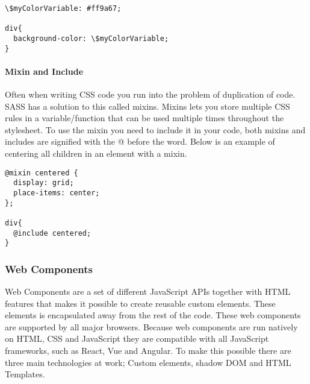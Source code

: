 \begin{lstlisting}[style=htmlcssjs]
\$myColorVariable: #ff9a67; 

div{
  background-color: \$myColorVariable;
}
\end{lstlisting}


\paragraph{Mixin and Include}
Often when writing CSS code you run into the problem of duplication of code. SASS has a solution to this called mixins. Mixins lets you store multiple CSS rules in a variable/function that can be used multiple times throughout the stylesheet. To use the mixin you need to include it in your code, both mixins and includes are signified with the @ before the word. Below is an example of centering all children in an element with a mixin.

\begin{lstlisting}[style=htmlcssjs]
@mixin centered {
  display: grid;
  place-items: center;
}; 

div{
  @include centered; 
}
\end{lstlisting}







\subsubsection{Web Components}%
\label{sub:Web Components}
Web Components are a set of different JavaScript APIs together with HTML features that makes it possible to create reusable custom elements\cite{WebComponentsMDN}. These elements is encapsulated away from the rest of the code. These web components are supported by all major browsers. Because web components are run natively on HTML, CSS and JavaScript they are compatible with all JavaScript frameworks, such as React, Vue and Angular. To make this possible there are three main technologies at work; Custom elements, shadow DOM and HTML Templates.

